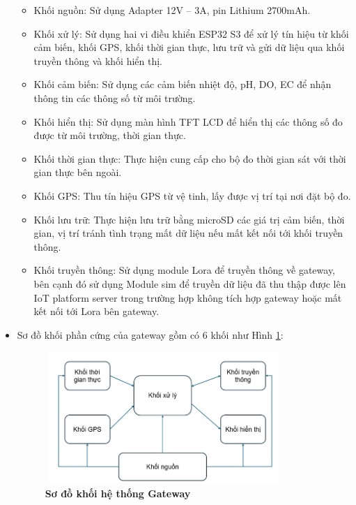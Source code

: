 \documentclass{article} %
\begin{document}
\begin{itemize}
		\begin{itemize}[label=$\ast$]
			\item Khối nguồn: Sử dụng Adapter 12V – 3A, pin Lithium 2700mAh.
			\item Khối xử lý: Sử dụng hai vi điều khiển ESP32 S3 để xử lý tín hiệu từ khối cảm biến, khối GPS, khối thời gian thực, lưu trữ và gửi dữ liệu qua khối truyền thông và khối hiển thị.
			\item Khối cảm biến: Sử dụng các cảm biến nhiệt độ, pH, DO, EC để nhận thông tin các thông số từ môi trường.
			\item Khối hiển thị: Sử dụng màn hình TFT LCD để hiển thị các thông số đo được từ môi trường, thời gian thực.
			\item Khối thời gian thực: Thực hiện cung cấp cho bộ đo thời gian sát với thời gian thực bên ngoài.
			\item Khối GPS: Thu tín hiệu GPS từ vệ tinh, lấy được vị trí tại nơi đặt bộ đo.
			\item Khối lưu trữ: Thực hiện lưu trữ bằng microSD các giá trị cảm biến, thời gian, vị trí tránh tình trạng mất dữ liệu nếu mất kết nối tới khối truyền thông.
			\item Khối truyền thông: Sử dụng module Lora để truyền thông về gateway, bên cạnh đó sử dụng Module sim để truyền dữ liệu đã thu thập được lên IoT platform server trong trường hợp không tích hợp gateway hoặc mất kết nối tới Lora bên gateway.
		\end{itemize}
		
		\item Sơ đồ khối phần cứng của gateway gồm có 6 khối như Hình \ref{Gateway}:
		\begin{figure}[!ht]
			\centering
			\includegraphics[width=9cm,height=5cm]{Images/Gateway.png}
			\caption[Sơ đồ khối hệ thống Gateway]{\bfseries \fontsize{12pt}{0pt}\selectfont Sơ đồ khối hệ thống Gateway}
			\label{Gateway}
		\end{figure}
		

\end{itemize}
\end{document}
